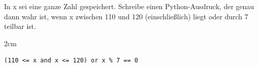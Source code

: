\question[2]
In x sei eine ganze Zahl gespeichert. Schreibe einen Python-Ausdruck, der genau
dann wahr ist, wenn x zwischen 110 und 120 (einschließlich) liegt oder durch 7 teilbar ist.
\begin{solutionbox}{2cm}
\begin{lstlisting}
(110 <= x and x <= 120) or x % 7 == 0
\end{lstlisting}
\end{solutionbox}